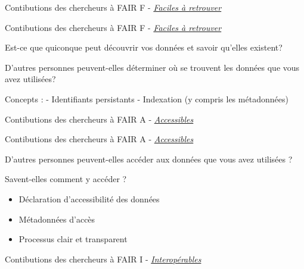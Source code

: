 \documentclass[
  ignorenonframetext,
]{beamer}
\providecommand{\tightlist}{%
  \setlength{\itemsep}{0pt}\setlength{\parskip}{0pt}}
\begin{document}
\begin{frame}{Contibutions des chercheurs à FAIR}
\label{contibutions-des-chercheurs-uxe0-fair}
F -
\href{https://faircookbook.elixir-europe.org/content/recipes/findability.html}{\emph{Faciles
à retrouver}}
\end{frame}

\begin{frame}{Contibutions des chercheurs à FAIR}
\label{contibutions-des-chercheurs-uxe0-fair-1}
F -
\href{https://faircookbook.elixir-europe.org/content/recipes/findability.html}{\emph{Faciles
à retrouver}}

Est-ce que quiconque peut découvrir vos données et savoir qu'elles
existent?

D'autres personnes peuvent-elles déterminer où se trouvent les données
que vous avez utilisées?

Concepts : - Identifiants persistants - Indexation (y compris les
métadonnées)
\end{frame}

\begin{frame}{Contibutions des chercheurs à FAIR}
\label{contibutions-des-chercheurs-uxe0-fair-2}
A -
\href{https://faircookbook.elixir-europe.org/content/recipes/accessibility.html}{\emph{Accessibles}}
\end{frame}

\begin{frame}{Contibutions des chercheurs à FAIR}
\label{contibutions-des-chercheurs-uxe0-fair-3}
A -
\href{https://faircookbook.elixir-europe.org/content/recipes/accessibility.html}{\emph{Accessibles}}

D'autres personnes peuvent-elles accéder aux données que vous avez
utilisées ?

Savent-elles comment y accéder ?

\begin{itemize}
\tightlist
\item
  Déclaration d'accessibilité des données
\item
  Métadonnées d'accès
\item
  Processus clair et transparent
\end{itemize}
\end{frame}

\begin{frame}{Contibutions des chercheurs à FAIR}
\label{contibutions-des-chercheurs-uxe0-fair-4}
I -
\href{https://faircookbook.elixir-europe.org/content/recipes/interoperability.html}{\emph{Interopérables}}
\end{frame}
\end{document}
